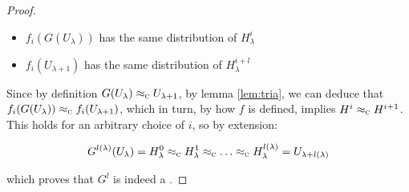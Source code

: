 \begin{proof}
    \begin{itemize}
        \item $f_{i}(G(U_{\lambda}))$ has the same distribution of $H_\lambda^{i}$
        \item $f_{i}(U_{\lambda + 1})$ has the same distribution of $H_\lambda^{i+l}$
    \end{itemize}

    Since by \prg{} definition $G(U_{\lambda}) \approx_\textsc{c} U_{\lambda + 1}$, by lemma \ref{lem:tria}, we can deduce that $f_{i}(G(U_{\lambda })) \approx_\textsc{c} f_{i}(U_{\lambda + 1})$, which in turn, by how $f$ is defined, implies $H^{i} \approx_\textsc{c} H^{i + 1}$. This holds for an arbitrary choice of $i$, so by extension:

    \begin{equation*}
        G^{l(\lambda)}(U_\lambda) = H_{\lambda}^{0} \compindist H_{\lambda}^{1} \compindist \dots \compindist H_{\lambda}^{{l(\lambda)}} = U_{\lambda + l(\lambda)}
    \end{equation*}

    which proves that $G^l$ is indeed a \prg.
\end{proof}

